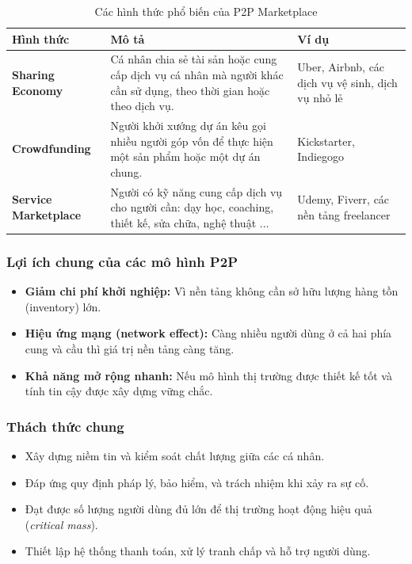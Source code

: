 \begin{table}[h!]
\centering
\caption{Các hình thức phổ biến của P2P Marketplace}
\begin{tabular}{|p{3cm}|p{7cm}|p{3.5cm}|}
\hline
\textbf{Hình thức} & \textbf{Mô tả} & \textbf{Ví dụ} \\ \hline
\textbf{Sharing \newline Economy} & 
Cá nhân chia sẻ tài sản hoặc cung cấp dịch vụ cá nhân mà người khác cần sử dụng, theo thời gian hoặc theo dịch vụ. & 
Uber, Airbnb, các dịch vụ vệ sinh, dịch vụ nhỏ lẻ \\ \hline

\textbf{Crowdfunding} & 
Người khởi xướng dự án kêu gọi nhiều người góp vốn để thực hiện một sản phẩm hoặc một dự án chung. &
Kickstarter, Indiegogo \\ \hline

\textbf{Service \newline Marketplace} &
Người có kỹ năng cung cấp dịch vụ cho người cần: dạy học, coaching, thiết kế, sửa chữa, nghệ thuật ... &
Udemy, Fiverr, các nền tảng freelancer \\ \hline
\end{tabular}
\end{table}

\subsubsection*{Lợi ích chung của các mô hình P2P}

\begin{itemize}
    \item \textbf{Giảm chi phí khởi nghiệp:} Vì nền tảng không cần sở hữu lượng hàng tồn (inventory) lớn.
    \item \textbf{Hiệu ứng mạng (network effect):} Càng nhiều người dùng ở cả hai phía cung và cầu thì giá trị nền tảng càng tăng.
    \item \textbf{Khả năng mở rộng nhanh:} Nếu mô hình thị trường được thiết kế tốt và tính tin cậy được xây dựng vững chắc.
\end{itemize}

\subsubsection*{Thách thức chung}

\begin{itemize}
    \item Xây dựng niềm tin và kiểm soát chất lượng giữa các cá nhân.
    \item Đáp ứng quy định pháp lý, bảo hiểm, và trách nhiệm khi xảy ra sự cố.
    \item Đạt được số lượng người dùng đủ lớn để thị trường hoạt động hiệu quả (\textit{critical mass}).
    \item Thiết lập hệ thống thanh toán, xử lý tranh chấp và hỗ trợ người dùng.
\end{itemize}

